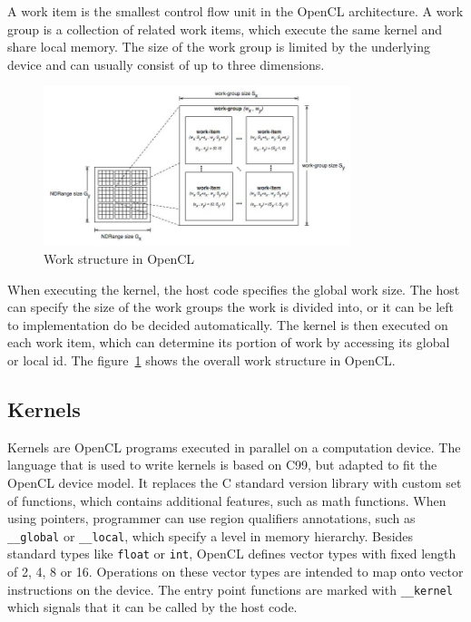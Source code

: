 \documentclass{l4proj}
\begin{document}
A work item is the smallest control flow unit in the OpenCL architecture. A work group is a 
collection of related work items, which execute the same kernel and share local memory.
The size of the work group is limited by the underlying device and can usually consist of up to 
three dimensions.

\begin{figure}
\centering
\includegraphics[width=0.8\textwidth]{images/opencl.jpg}
\caption{Work structure in OpenCL ~\protect\footnotemark}
\label{fig:opencl}
\end{figure}

When executing the kernel, the host code specifies the global work size. The host can specify 
the size of the work groups the work is divided into, or it can be left to implementation do be decided
automatically. The kernel is then executed on each work item, which can determine its portion 
of work by accessing its global or local id. The figure~\ref{fig:opencl} shows the overall work structure in OpenCL.

\subsection{Kernels}

Kernels are OpenCL programs executed in parallel on a computation device. The language that is
used to write kernels is based on C99, but adapted to fit the OpenCL device model. It replaces 
the C standard version library with custom set of functions, which contains additional features, such as 
math functions. When using pointers, programmer can use region qualifiers annotations, such as
\texttt{\_\_global} or \texttt{\_\_local}, which specify a level in memory hierarchy. Besides standard
types like \texttt{float} or \texttt{int}, OpenCL defines vector types with fixed length
of 2, 4, 8 or 16. Operations on these vector types are intended to map onto vector instructions on the device.
The entry point functions are marked with \texttt{\_\_kernel} which signals that it can be called by the host code.
\end{document}
